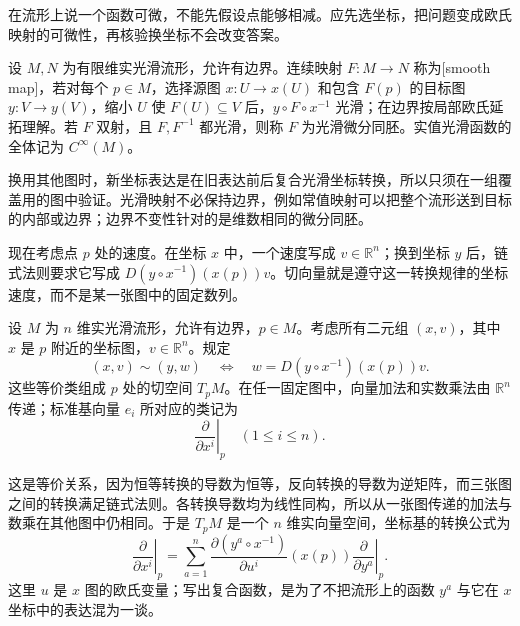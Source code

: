 在流形上说一个函数可微，不能先假设点能够相减。应先选坐标，把问题变成欧氏映射的可微性，再核验换坐标不会改变答案。

\begin{definition}[光滑映射]\label{b1:def:E-smooth-map}
设 \(M,N\) 为有限维实光滑流形，允许有边界。连续映射 \(F:M\rightarrow N\) 称为[smooth map]，若对每个 \(p\in M\)，选择源图 \(x:U\rightarrow x(U)\) 和包含 \(F(p)\) 的目标图 \(y:V\rightarrow y(V)\)，缩小 \(U\) 使 \(F(U)\subseteq V\) 后，\(y\circ F\circ x^{-1}\) 光滑；在边界按局部欧氏延拓理解。若 \(F\) 双射，且 \(F,F^{-1}\) 都光滑，则称 \(F\) 为光滑微分同胚。实值光滑函数的全体记为 \(C^\infty(M)\)。
\end{definition}

换用其他图时，新坐标表达是在旧表达前后复合光滑坐标转换，所以只须在一组覆盖用的图中验证。光滑映射不必保持边界，例如常值映射可以把整个流形送到目标的内部或边界；边界不变性针对的是维数相同的微分同胚。

\ProseParagraphBreak

现在考虑点 \(p\) 处的速度。在坐标 \(x\) 中，一个速度写成 \(v\in\mathbb R^n\)；换到坐标 \(y\) 后，链式法则要求它写成 \(D(y\circ x^{-1})(x(p))v\)。切向量就是遵守这一转换规律的坐标速度，而不是某一张图中的固定数列。

\begin{definition}[切空间的坐标构造]\label{b1:def:E-tangent-space}
设 \(M\) 为 \(n\) 维实光滑流形，允许有边界，\(p\in M\)。考虑所有二元组 \((x,v)\)，其中 \(x\) 是 \(p\) 附近的坐标图，\(v\in\mathbb R^n\)。规定
\[
 (x,v)\sim(y,w)
 \quad\Longleftrightarrow\quad
 w=D(y\circ x^{-1})(x(p))v.
\]
这些等价类组成 \(p\) 处的切空间 \(T_pM\)。在任一固定图中，向量加法和实数乘法由 \(\mathbb R^n\) 传递；标准基向量 \(e_i\) 所对应的类记为
\[
 \left.\frac{\partial}{\partial x^i}\right|_p
 \quad(1\leq i\leq n).
\]
\end{definition}

这是等价关系，因为恒等转换的导数为恒等，反向转换的导数为逆矩阵，而三张图之间的转换满足链式法则。各转换导数均为线性同构，所以从一张图传递的加法与数乘在其他图中仍相同。于是 \(T_pM\) 是一个 \(n\) 维实向量空间，坐标基的转换公式为
\[
 \left.\frac{\partial}{\partial x^i}\right|_p
 =\sum_{a=1}^n
 \frac{\partial(y^a\circ x^{-1})}{\partial u^i}(x(p))
 \left.\frac{\partial}{\partial y^a}\right|_p.
\]
这里 \(u\) 是 \(x\) 图的欧氏变量；写出复合函数，是为了不把流形上的函数 \(y^a\) 与它在 \(x\) 坐标中的表达混为一谈。

